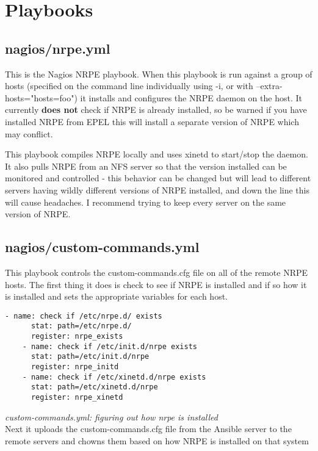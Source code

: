 \documentclass[a4paper]{article}
\begin{document}
\section{Playbooks}

\subsection{nagios/nrpe.yml} 

This is the Nagios NRPE playbook. When this playbook is run against a group of hosts (specified on the command line individually using -i, or with --extra-hosts="hosts=foo") it installs and configures the NRPE daemon on the host. It currently \textbf{does not} check if NRPE is already installed, so be warned if you have installed NRPE from EPEL this will install a separate version of NRPE which may conflict.

This playbook compiles NRPE locally and uses xinetd to start/stop the daemon. It also pulls NRPE from an NFS server so that the version installed can be monitored and controlled - this behavior can be changed but will lead to different servers having wildly different versions of NRPE installed, and down the line this will cause headaches. I recommend trying to keep every server on the same version of NRPE.

\subsection{nagios/custom-commands.yml}

This playbook controls the custom-commands.cfg file on all of the remote NRPE hosts. The first thing it does is check to see if NRPE is installed and if so how it is installed and sets the appropriate variables for each host.

\begin{lstlisting}[language=nagconf]
    - name: check if /etc/nrpe.d/ exists
      stat: path=/etc/nrpe.d/
      register: nrpe_exists
    - name: check if /etc/init.d/nrpe exists
      stat: path=/etc/init.d/nrpe
      register: nrpe_initd
    - name: check if /etc/xinetd.d/nrpe exists
      stat: path=/etc/xinetd.d/nrpe
      register: nrpe_xinetd
\end{lstlisting}
\hfill \textit{custom-commands.yml: figuring out how nrpe is installed}\\

Next it uploads the custom-commands.cfg file from the Ansible server to the remote servers and chowns them based on how NRPE is installed on that system
\end{document}

